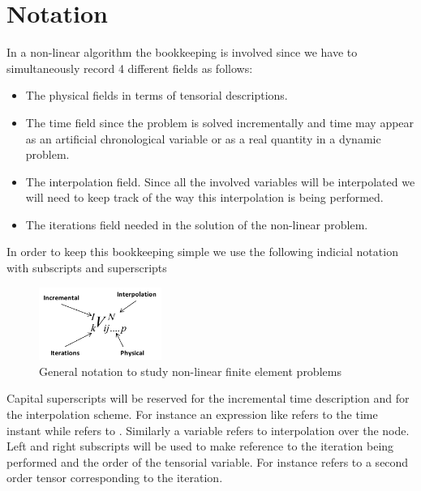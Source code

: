 \section*{Notation}
In a non-linear algorithm the bookkeeping is involved since we have to simultaneously record 4 different fields as follows:
\begin{itemize}
	\item The physical fields in terms of tensorial descriptions.
	\item The time field since the problem is solved incrementally 	and time may appear as an artificial chronological variable 	or as a real quantity in a dynamic problem.
	\item The interpolation field.  Since all the involved variables will be interpolated we will need to keep track of the way this interpolation is being performed.
	\item The iterations field needed in the solution of the non-linear problem.
\end{itemize}
In order to keep this bookkeeping simple we use the following indicial notation with subscripts and superscripts

\begin{figure}[h]
\centering
\includegraphics[width=4cm]{img/figure1_1.pdf}
\caption{General notation to study non-linear finite element problems}
\label{fig:notation}
\end{figure}

Capital superscripts will be reserved for the incremental time description and for the interpolation scheme.  For instance an expression like   refers to the time instant   while   refers to . Similarly a variable   refers to interpolation over the node. Left and right subscripts will be used to make reference to the iteration being performed and the order of the tensorial variable.  For instance   refers to a second order tensor corresponding to the iteration.